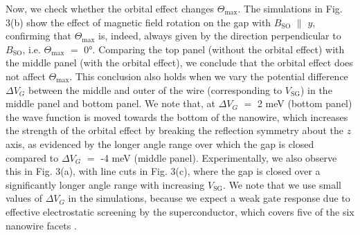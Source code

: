 Now, we check whether the orbital effect changes $\Theta_{\mathrm{max}}$.
The simulations in Fig. 3(b) show the effect of magnetic field rotation on the gap with $B_{\mathrm{SO}}$ $\parallel$ $y$, confirming that $\Theta_{\mathrm{max}}$ is, indeed, always given by the direction perpendicular to $B_{\mathrm{SO}}$, i.e.
$\Theta_{\mathrm{max}}$ $=$ \ang{0}.
Comparing the top panel (without the orbital effect) with the middle panel (with the orbital effect), we conclude that the orbital effect does not affect $\Theta_{\mathrm{max}}$.
This conclusion also holds when we vary the potential difference $\Delta V_G$ between the middle and outer of the wire (corresponding to $V_{\mathrm{SG}}$) in the middle panel and bottom panel.
We note that, at $\Delta V_G$ $=$ 2 meV (bottom panel) the wave function is moved towards the bottom of the nanowire, which increases the strength of the orbital effect by breaking the reflection symmetry about the $z$ axis, as evidenced by the longer angle range over which the gap is closed compared to $\Delta V_G$ $=$ -4 meV (middle panel).
Experimentally, we also observe this in Fig. 3(a), with line cuts in Fig. 3(c), where the gap is closed over a significantly longer angle range with increasing $V_{\mathrm{SG}}$.
We note that we use small values of $\Delta V_G$ in the simulations, because we expect a weak gate response due to effective electrostatic screening by the superconductor, which covers five of the six nanowire facets \cite{BalSc}.

